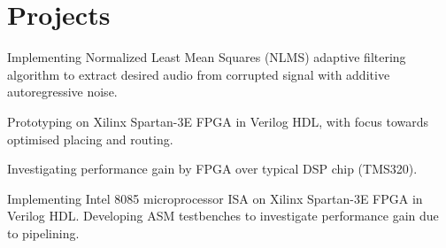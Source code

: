\documentclass[]{deedy-resume-openfont}%
\begin{document}
\begin{minipage}[t]{0.72\textwidth}%
%
\section{Projects}%
%
%
%
\vspace{\topsep}%
\begin{tightemize}%
\item Implementing Normalized Least Mean Squares (NLMS) adaptive filtering algorithm to extract desired audio from corrupted signal with additive autoregressive noise.
\item Prototyping on Xilinx Spartan-3E FPGA in Verilog HDL, with focus towards optimised placing and routing.
\item Investigating performance gain by FPGA over typical DSP chip (TMS320).
\end{tightemize}%
\sectionsep
%
%
%
%
\begin{tightemize}%
\item Implementing Intel 8085 microprocessor ISA on Xilinx Spartan-3E FPGA in Verilog HDL. Developing ASM testbenches to investigate performance gain due to pipelining.
\end{tightemize}%
\sectionsep
%
%
%
\begin{tightemize}%
\item
\end{tightemize}%
\sectionsep
%

\end{minipage}
\end{document}
